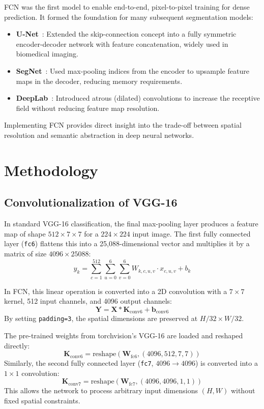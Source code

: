 \documentclass[conference]{IEEEtran}
\begin{document}
FCN was the first model to enable end-to-end, pixel-to-pixel training for dense prediction. It formed the foundation for many subsequent segmentation models:
\begin{itemize}
    \item \textbf{U-Net}~\cite{ronneberger2015u}: Extended the skip-connection concept into a fully symmetric encoder-decoder network with feature concatenation, widely used in biomedical imaging.
    \item \textbf{SegNet}~\cite{badrinarayanan2017segnet}: Used max-pooling indices from the encoder to upsample feature maps in the decoder, reducing memory requirements.
    \item \textbf{DeepLab}~\cite{chen2017rethinking}: Introduced atrous (dilated) convolutions to increase the receptive field without reducing feature map resolution.
\end{itemize}

Implementing FCN provides direct insight into the trade-off between spatial resolution and semantic abstraction in deep neural networks.

\section{Methodology}

\subsection{Convolutionalization of VGG-16}
In standard VGG-16 classification, the final max-pooling layer produces a feature map of shape $512 \times 7 \times 7$ for a $224 \times 224$ input image. The first fully connected layer (\texttt{fc6}) flattens this into a 25,088-dimensional vector and multiplies it by a matrix of size $4096 \times 25088$:
\begin{equation}
y_k = \sum_{c=1}^{512} \sum_{u=0}^{6} \sum_{v=0}^{6} W_{k, c, u, v} \cdot x_{c, u, v} + b_k
\end{equation}

In FCN, this linear operation is converted into a 2D convolution with a $7 \times 7$ kernel, 512 input channels, and 4096 output channels:
\begin{equation}
\mathbf{Y} = \mathbf{X} \ast \mathbf{K}_{\text{conv6}} + \mathbf{b}_{\text{conv6}}
\end{equation}
By setting \texttt{padding=3}, the spatial dimensions are preserved at $H/32 \times W/32$. 

The pre-trained weights from torchvision's VGG-16 are loaded and reshaped directly:
\begin{equation}
\mathbf{K}_{\text{conv6}} = \text{reshape}(\mathbf{W}_{\text{fc6}}, (4096, 512, 7, 7))
\end{equation}
Similarly, the second fully connected layer (\texttt{fc7}, $4096 \rightarrow 4096$) is converted into a $1 \times 1$ convolution:
\begin{equation}
\mathbf{K}_{\text{conv7}} = \text{reshape}(\mathbf{W}_{\text{fc7}}, (4096, 4096, 1, 1))
\end{equation}
This allows the network to process arbitrary input dimensions $(H, W)$ without fixed spatial constraints.
\end{document}
